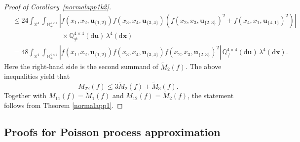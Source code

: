 \documentclass{article}
\theoremstyle{definition}
\numberwithin{equation}{section}
\theoremstyle{remark}
\begin{document}
\begin{proof}[Proof of Corollary~\ref{normalapp1k2}]
\begin{align*}
& \leq 24\int_{\mathbb{X}^4} \int_{\mathbb{M}_{\neq}^{4\times 4}} |f(x_1,x_2,\mathbf{u}_{\{1,2\}})  f(x_3,x_4,\mathbf{u}_{\{3,4\}}) (f(x_2,x_3,\mathbf{u}_{\{2,3\}})^2+f(x_4,x_1,\mathbf{u}_{\{4,1\}})^2)| \\
& \hspace{3cm} \times \mathbb{Q}_{\neq}^{4\times 4}(\mathrm{d}\mathbf{u}) \, \lambda^4(\mathrm{d}\mathbf{x}) \\
& = 48\int_{\mathbb{X}^4} \int_{\mathbb{M}_{\neq}^{4\times 4}} |f(x_1,x_2,\mathbf{u}_{\{1,2\}})  f(x_3,x_4,\mathbf{u}_{\{3,4\}}) f(x_2,x_3,\mathbf{u}_{\{2,3\}})^2| \, \mathbb{Q}_{\neq}^{4\times 4}(\mathrm{d}\mathbf{u}) \, \lambda^4(\mathrm{d}\mathbf{x}).
\end{align*}
Here the right-hand side is the second summand of $\widetilde{M}_{2}(f)$. The above inequalities yield that
$$
M_{22}(f) \leq 3 \widetilde{M}_2(f) + \widetilde{M}_3(f).
$$
Together with $M_{11}(f)=\widetilde{M}_1(f)$ and $M_{12}(f)=\widetilde{M}_2(f)$, the statement follows from Theorem \ref{normalapp1}.
\end{proof}

\subsection{Proofs for Poisson process approximation}%
\end{document}
